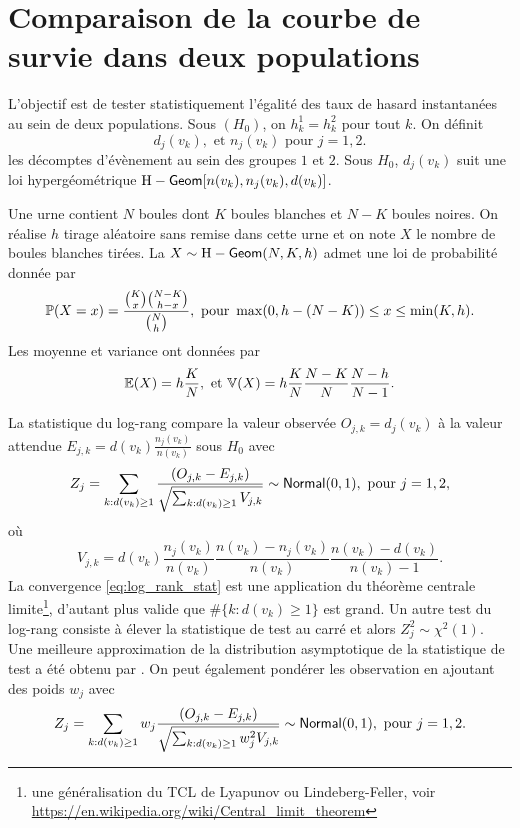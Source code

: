 \section{Comparaison de la courbe de survie dans deux populations}
L'objectif est de tester statistiquement l'égalité des taux de hasard instantanées au sein de deux populations. Sous $(H_0)$, on $h_k^1 =h_k^2$ pour tout $k$. On définit 
$$
d_j(v_k),\text{ et } n_j(v_k)\text{ pour }j=1,2. 
$$
les décomptes d'évènement au sein des groupes $1$ et $2$. Sous $H_0$, $d_j(v_k)$ suit une loi hypergéométrique $\text{H}-\mathsf{Geom}[n(v_k), n_j(v_k),  d(v_k)]$.
\begin{definition}
Une urne contient $N$ boules dont $K$ boules blanches et $N-K$ boules noires. On réalise $h$ tirage aléatoire sans remise dans cette urne et on note $X$ le nombre de boules blanches tirées. La \va $X\sim \text{H}-\mathsf{Geom}(N, K, h)$ admet une loi de probabilité donnée par
$$
\mathbb{P}(X = x)=\frac{\binom{K}{x}\binom{N-K}{h-x}}{\binom{N}{h}},\text{ pour }\max(0, h-(N-K))\leq x\leq\min(K,h).
$$ 
Les moyenne et variance ont données par 
$$
\mathbb{E}(X) =h\frac{K}{N},\text{ et }\mathbb{V}(X) = h\frac{K}{N}\frac{N-K}{N}\frac{N-h}{N-1}.
$$
\end{definition}
La statistique du log-rang compare la valeur observée $O_{j,k} = d_j(v_k)$ à la valeur attendue $E_{j,k} = d(v_k)\frac{n_j(v_k)}{n(v_k)}$ sous $H_0$ avec 
\begin{equation}\label{eq:log_rank_stat}
Z_j=\sum_{k: d(v_k)\geq 1}\frac{(O_{j,k} - E_{j,k})}{\sqrt{\sum_{k: d(v_k)\geq 1}V_{j,k}}}\sim \mathsf{Normal}(0,1),\text{ pour }j = 1,2,
\end{equation}
où
$$
V_{j,k}=d(v_k)\frac{n_j(v_k)}{n(v_k)}\frac{n(v_k)-n_j(v_k)}{n(v_k)}\frac{n(v_k)-d(v_k)}{n(v_k)-1}.
$$
La convergence \eqref{eq:log_rank_stat} est une application du théorème centrale limite\footnote{une généralisation du TCL de Lyapunov ou Lindeberg-Feller, voir \url{https://en.wikipedia.org/wiki/Central_limit_theorem}}, d'autant plus valide que $\#\{k: d(v_k)\geq 1\}$ est grand. Un autre test du log-rang consiste à élever la statistique de test au carré et alors $Z_j^2\sim \chi^2(1)$. Une meilleure approximation de la distribution asymptotique de la statistique de test a été obtenu par \citet{Peto1972}. On peut également pondérer les observation en ajoutant des poids $w_j$ avec 
\begin{equation}\label{eq:log_rank_stat_weighted}
Z_j=\sum_{k: d(v_k)\geq 1}w_j\frac{(O_{j,k} - E_{j,k})}{\sqrt{\sum_{k: d(v_k)\geq 1}w_j^2V_{j,k}}}\sim \mathsf{Normal}(0,1),\text{ pour }j = 1,2.
\end{equation}

